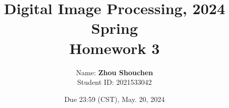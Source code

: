 \documentclass[10pt]{article}
\begin{document}
\title{	Digital Image Processing, 2024 Spring\\Homework 3}
\date{Due 23:59 (CST), May. 20, 2024 }

\author{
    Name: \textbf{Zhou Shouchen} \\
	Student ID: 2021533042
}

\maketitle

\newpage



\end{document}
